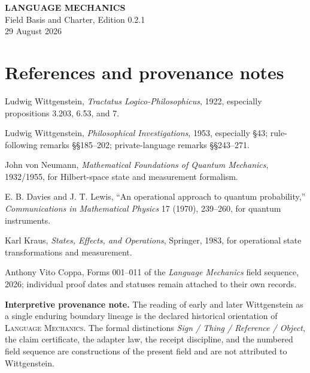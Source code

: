 \documentclass[10.5pt]{article}
\newcommand{\LM}{\textsc{Language Mechanics}}
\begin{document}
\vfill
\begin{center}
{\small\bfseries LANGUAGE MECHANICS}\\
{\small Field Basis and Charter, Edition 0.2.1}\\
{\small 29 August 2026}
\end{center}

\clearpage
\section*{References and provenance notes}
\small
\begin{enumerate}[label={[\arabic*]}]
\item Ludwig Wittgenstein, \emph{Tractatus Logico-Philosophicus}, 1922, especially propositions 3.203, 6.53, and 7.
\item Ludwig Wittgenstein, \emph{Philosophical Investigations}, 1953, especially \S43; rule-following remarks \S\S185--202; private-language remarks \S\S243--271.
\item John von Neumann, \emph{Mathematical Foundations of Quantum Mechanics}, 1932/1955, for Hilbert-space state and measurement formalism.
\item E. B. Davies and J. T. Lewis, ``An operational approach to quantum probability,'' \emph{Communications in Mathematical Physics} 17 (1970), 239--260, for quantum instruments.
\item Karl Kraus, \emph{States, Effects, and Operations}, Springer, 1983, for operational state transformations and measurement.
\item Anthony Vito Coppa, Forms 001--011 of the \emph{Language Mechanics} field sequence, 2026; individual proof dates and statuses remain attached to their own records.
\end{enumerate}

\textbf{Interpretive provenance note.} The reading of early and later Wittgenstein as a single enduring boundary lineage is the declared historical orientation of \LM. The formal distinctions \emph{Sign / Thing / Reference / Object}, the claim certificate, the adapter law, the receipt discipline, and the numbered field sequence are constructions of the present field and are not attributed to Wittgenstein.
\end{document}
